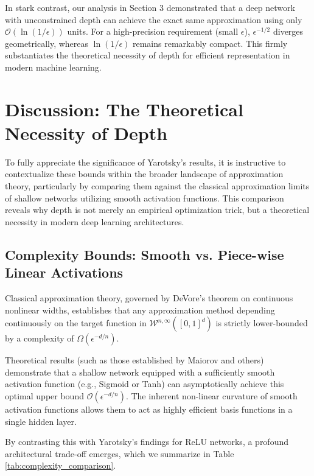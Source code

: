 \documentclass[12pt]{article}
\begin{document}
In stark contrast, our analysis in Section 3 demonstrated that a deep network with unconstrained depth can achieve the exact same approximation using only $\mathcal{O}(\ln(1/\epsilon))$ units. For a high-precision requirement (small $\epsilon$), $\epsilon^{-1/2}$ diverges geometrically, whereas $\ln(1/\epsilon)$ remains remarkably compact. This firmly substantiates the theoretical necessity of depth for efficient representation in modern machine learning.




\section{Discussion: The Theoretical Necessity of Depth}

To fully appreciate the significance of Yarotsky's results, it is instructive to contextualize these bounds within the broader landscape of approximation theory, particularly by comparing them against the classical approximation limits of shallow networks utilizing smooth activation functions. This comparison reveals why depth is not merely an empirical optimization trick, but a theoretical necessity in modern deep learning architectures.

\subsection{Complexity Bounds: Smooth vs. Piece-wise Linear Activations}
Classical approximation theory, governed by DeVore's theorem on continuous nonlinear widths, establishes that any approximation method depending continuously on the target function in $\mathcal{W}^{n,\infty}([0,1]^d)$ is strictly lower-bounded by a complexity of $\Omega(\epsilon^{-d/n})$. 

Theoretical results (such as those established by Maiorov and others) demonstrate that a shallow network equipped with a sufficiently smooth activation function (e.g., Sigmoid or Tanh) can asymptotically achieve this optimal upper bound $\mathcal{O}(\epsilon^{-d/n})$. The inherent non-linear curvature of smooth activation functions allows them to act as highly efficient basis functions in a single hidden layer.

By contrasting this with Yarotsky's findings for ReLU networks, a profound architectural trade-off emerges, which we summarize in Table \ref{tab:complexity_comparison}.
\end{document}
